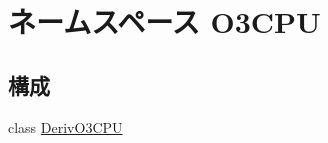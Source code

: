 \hypertarget{namespaceO3CPU}{
\section{ネームスペース O3CPU}
\label{namespaceO3CPU}
}
\subsection*{構成}
\begin{DoxyCompactItemize}
\item 
class \hyperlink{classO3CPU_1_1DerivO3CPU}{DerivO3CPU}
\end{DoxyCompactItemize}
